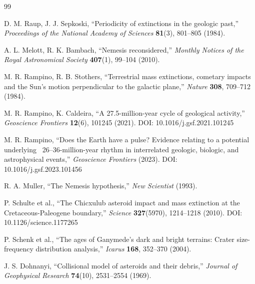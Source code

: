 \documentclass[11pt,a4paper]{article}
\begin{document}
		\begin{thebibliography}{99}
		
		D. M. Raup, J. J. Sepkoski, ``Periodicity of extinctions in the geologic past,''
		\emph{Proceedings of the National Academy of Sciences} \textbf{81}(3), 801–805 (1984).
		
		A. L. Melott, R. K. Bambach, ``Nemesis reconsidered,''
		\emph{Monthly Notices of the Royal Astronomical Society} \textbf{407}(1), 99–104 (2010).
		
		M. R. Rampino, R. B. Stothers, ``Terrestrial mass extinctions, cometary impacts and the Sun's motion perpendicular to the galactic plane,''
		\emph{Nature} \textbf{308}, 709–712 (1984).
		
		M. R. Rampino, K. Caldeira, ``A 27.5-million-year cycle of geological activity,''
		\emph{Geoscience Frontiers} \textbf{12}(6), 101245 (2021). DOI: 10.1016/j.gsf.2021.101245
		
		M. R. Rampino, ``Does the Earth have a pulse? Evidence relating to a potential underlying ~26–36-million-year rhythm in interrelated geologic, biologic, and astrophysical events,''
		\emph{Geoscience Frontiers} (2023). DOI: 10.1016/j.gsf.2023.101456
		
		R. A. Muller, ``The Nemesis hypothesis,''
		\emph{New Scientist} (1993).
		
		P. Schulte et al., ``The Chicxulub asteroid impact and mass extinction at the Cretaceous-Paleogene boundary,''
		\emph{Science} \textbf{327}(5970), 1214–1218 (2010). DOI: 10.1126/science.1177265
		
		P. Schenk et al., ``The ages of Ganymede's dark and bright terrains: Crater size-frequency distribution analysis,''
		\emph{Icarus} \textbf{168}, 352–370 (2004).
		
		J. S. Dohnanyi, ``Collisional model of asteroids and their debris,''
		\emph{Journal of Geophysical Research} \textbf{74}(10), 2531–2554 (1969).
		

\end{thebibliography}
\end{document}
